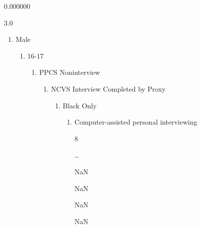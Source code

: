\documentclass[
  letterpaper,
  DIV=11,
  numbers=noendperiod]{scrreprt}
\providecommand{\tightlist}{%
  \setlength{\itemsep}{0pt}\setlength{\parskip}{0pt}}\usepackage{longtable,booktabs,array}
\begin{document}
\begin{enumerate}
\begin{enumerate}
\begin{enumerate}
\begin{enumerate}
\begin{enumerate}
\begin{enumerate}
\begin{enumerate}
\begin{enumerate}
\begin{enumerate}
\begin{enumerate}
                    0.000000

                    3.0

                    \begin{enumerate}
                    \def\labelenumxi{(\arabic{enumxi})}
                    \tightlist
                    \item
                      Male

                      \begin{enumerate}
                      \def\labelenumxii{(\arabic{enumxii})}
                      \tightlist
                      \item
                        16-17

                        \begin{enumerate}
                        \def\labelenumxiii{(\arabic{enumxiii})}
                        \tightlist
                        \item
                          PPCS Noninterview

                          \begin{enumerate}
                          \def\labelenumxiv{(\arabic{enumxiv})}
                          \tightlist
                          \item
                            NCVS Interview Completed by Proxy

                            \begin{enumerate}
                            \def\labelenumxv{(\arabic{enumxv})}
                            \tightlist
                            \item
                              Black Only

                              \begin{enumerate}
                              \def\labelenumxvi{(\arabic{enumxvi})}
                              \tightlist
                              \item
                                Computer-assisted personal interviewing

                                8

                                \ldots{}

                                NaN

                                NaN

                                NaN

                                NaN


\end{enumerate}
\end{enumerate}
\end{enumerate}
\end{enumerate}
\end{enumerate}
\end{enumerate}
\end{enumerate}
\end{enumerate}
\end{enumerate}
\end{enumerate}
\end{enumerate}
\end{enumerate}
\end{enumerate}
\end{enumerate}
\end{enumerate}
\end{enumerate}
\end{document}
